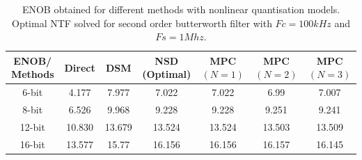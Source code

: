 \documentclass[a4paper]{article}
\begin{document}
\begin{table}[!h]
\caption{ENOB obtained for different methods with nonlinear quantisation models. Optimal NTF solved for second order butterworth filter with $Fc = 100 \mathit{kHz}$ and $Fs = 1 \mathit{Mhz}$.}
	\centering
	\begin{tabular}{|c|c|c|c|c|c|c|}
	\hline
	ENOB/ Methods & Direct & DSM & NSD (Optimal) & MPC $(N = 1)$ & MPC $(N= 2)$ & MPC $(N= 3)$  \\
        \hline
        6-bit &4.177 & 7.977 & 7.022  & 7.022 & 6.99 & 7.007\\
        \hline
        8-bit & 6.526 & 9.968 & 9.228  & 9.228 & 9.251 & 9.241\\
         \hline
        12-bit & 10.830 & 13.679 & 13.524 & 13.524 & 13.503 & 13.509\\
	\hline
	16-bit & 13.577 & 15.77 & 16.156  & 16.156 & 16.157& 16.145 \\
	\hline
	\end{tabular}		
\end{table}
\end{document}
